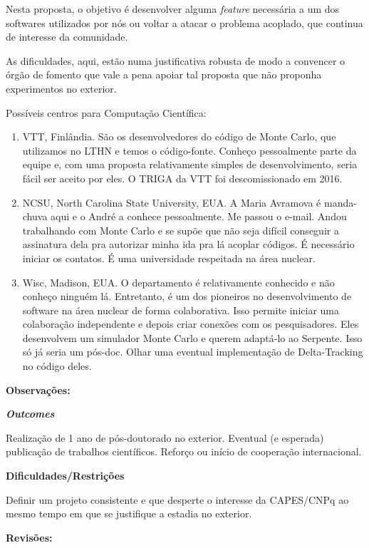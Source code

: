 Nesta proposta, o objetivo é desenvolver alguma \textit{feature} necessária a um 
dos softwares utilizados por nós ou voltar a atacar o problema acoplado, que 
continua de interesse da comunidade.

As dificuldades, aqui, estão numa justificativa robusta de modo a convencer o 
órgão de fomento que vale a pena apoiar tal proposta que não proponha experimentos 
no exterior.

Possíveis centros para Computação Científica:
\begin{enumerate}
	\item VTT, Finlândia. São os desenvolvedores do código de Monte Carlo, que utilizamos no LTHN e temos o código-fonte. Conheço pessoalmente parte da equipe e, 
	com uma proposta relativamente simples de desenvolvimento, seria fácil ser aceito por eles. O TRIGA da VTT foi descomissionado em 2016.
	\item NCSU, North Carolina State University, EUA. A Maria Avramova é manda-chuva aqui e o André a conhece pessoalmente. Me passou o e-mail. Andou trabalhando com Monte Carlo e se supõe que não seja difícil conseguir a assinatura dela pra autorizar minha ida pra lá acoplar códigos. É necessário iniciar os contatos. É uma universidade respeitada na área nuclear.
	\item Wisc, Madison, EUA. O departamento é relativamente conhecido e não conheço ninguém lá. Entretanto, é um dos pioneiros no desenvolvimento de software na área nuclear de forma colaborativa. Isso permite iniciar uma colaboração independente e depois criar conexões com os pesquisadores. Eles desenvolvem um simulador Monte Carlo e querem adaptá-lo ao Serpente. Isso só já seria um pós-doc. Olhar uma eventual implementação de Delta-Tracking no código deles.
	
\end{enumerate}
\textbf{Observações:}



\textbf{\textit{Outcomes}}

Realização de 1 ano de pós-doutorado no exterior. Eventual (e esperada) publicação 
de trabalhos científicos. Reforço ou início de cooperação internacional.

\textbf{Dificuldades/Restrições}

Definir um projeto consistente e que desperte o interesse da CAPES/CNPq ao mesmo 
tempo em que se justifique a estadia no exterior.

\textbf{Revisões:}

\date{\today}

